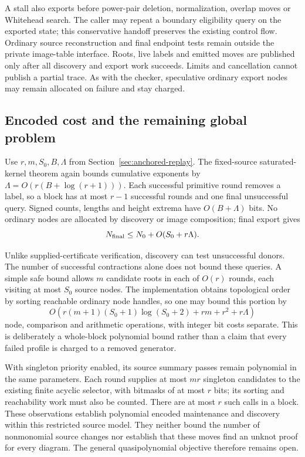 A stall also exports before power-pair deletion, normalization, overlap moves
or Whitehead search. The caller may repeat a boundary eligibility query on
the exported state; this conservative handoff preserves the existing control
flow. Ordinary source reconstruction and final endpoint tests remain outside
the private image-table interface. Roots, live labels and emitted moves are
published only after all discovery and export work succeeds. Limits and
cancellation cannot publish a partial trace. As with the checker, speculative
ordinary export nodes may remain allocated on failure and stay charged.

\subsection{Encoded cost and the remaining global problem}

Use $r,m,S_0,B,\Lambda$ from Section~\ref{sec:anchored-replay}. The fixed-source
saturated-kernel theorem again bounds cumulative exponents by
$\Lambda=O(r(B+\log(r+1)))$. Each successful primitive round removes a
label, so a block has at most $r-1$ successful rounds and one final unsuccessful
query. Signed counts, lengths and height extrema have $O(B+\Lambda)$ bits.
No ordinary nodes are allocated by discovery or image composition; final
export gives
\[
 N_{\rm final}\le N_0+O(S_0+r\Lambda).
\]

Unlike supplied-certificate verification, discovery can test unsuccessful
donors. The number of successful contractions alone does not bound these
queries. A simple safe bound allows $m$ candidate roots in each of $O(r)$
rounds, each visiting at most $S_0$ source nodes. The implementation obtains
topological order by sorting reachable ordinary node handles, so one may
bound this portion by
\[
 O\!\left(r(m+1)(S_0+1)\log(S_0+2)+rm+r^2+r\Lambda\right)
\]
node, comparison and arithmetic operations, with integer bit costs separate.
This is deliberately a whole-block polynomial bound rather than a claim
that every failed profile is charged to a removed generator.

With singleton priority enabled, its source summary passes remain polynomial
in the same parameters. Each round supplies at most $mr$ singleton candidates
to the existing finite acyclic selector, with bitmasks of at most $r$ bits;
its sorting and reachability work must also be counted. There are at most
$r$ such calls in a block. These observations establish polynomial encoded
maintenance and discovery within this restricted source model. They neither
bound the number of nonmonomial source changes nor establish that these moves
find an unknot proof for every diagram. The general quasipolynomial objective
therefore remains open.


